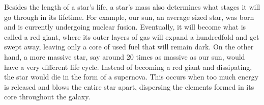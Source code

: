\documentclass[12pt]{article}
\begin{document}
Besides the length of a star's life, a star's mass also determines what stages
it will go through in its lifetime.  For example, our sun, an average sized star,
was born and is currently undergoing nuclear fusion.  Eventually, it will become
what is called a red giant, where its outer layers of gas will expand a
hundredfold and get swept away, leaving only a core of used fuel that will
remain dark.  On the other hand, a more massive star, say around 20 times as
massive as our sun, would have a very different life cycle.  Instead of becoming
a red giant and dissipating, the star would die in the form of a supernova.
This occurs when too much energy is released and blows the entire star apart,
dispersing the elements formed in its core throughout the galaxy.
\end{document}
